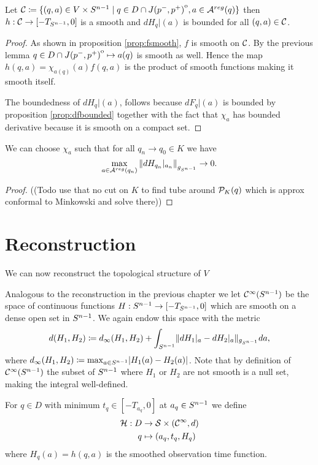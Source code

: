 \begin{corollary}\label{cor:hsmooth}
    Let ${\mathcal{C}}\coloneqq \{(q,a)\in V\times {S^{n-1}} \mid q \in D\cap {\kern0ptJ(p^-,p^+)}^{\mathrm{o}}, a\in {{\mathcal{A}}^{reg}}(q)\}$ then $h:{\mathcal{C}}\to [-T_{S^{n-1}},0]$ is a smooth and $dH_q\rvert(a)$ is bounded for all $(q,a)\in {\mathcal{C}}$.
\end{corollary}
\begin{proof}
    As shown in proposition \ref{prop:fsmooth}, $f$ is smooth on ${\mathcal{C}}$. By the previous lemma $q\in D\cap {\kern0ptJ(p^-,p^+)}^{\mathrm{o}}\mapsto a(q)$ is smooth as well.
    Hence the map $h(q,a) = \chi_{a(q)}(a)f(q,a)$ is the product of smooth functions making it smooth itself.

    The boundedness of $dH_q\rvert(a)$, follows because $dF_q\rvert(a)$ is bounded by proposition \ref{prop:dfbounded} together with the fact that $\chi_{a}$ has bounded derivative because it is smooth on a compact set.
\end{proof}

\begin{lemma}\label{lem:dhconvonboundary}
    We can choose $\chi_a$ such that for all $q_n \to q_0\in K$ we have
    \[
        \max_{a\in {{\mathcal{A}}^{reg}}(q_n)} \left\lVert dH_{q_n}\rvert_{a_n}\right\rVert_{g_{S^{n-1}}}\to 0.
    \]
\end{lemma}
\begin{proof}
    ((Todo use that no cut on $K$ to find tube around ${{\mathcal{P}}_K(q)}$ which is approx conformal to Minkowski and solve there))
\end{proof}

\section{Reconstruction}
We can now reconstruct the topological structure of $V$

Analogous to the reconstruction in the previous chapter we let ${\mathcal{C}}^{\infty}({S^{n-1}})$ be the space of continuous functions $H:{S^{n-1}} \to [-T_{S^{n-1}},0]$ which are smooth on a dense open set in ${S^{n-1}}$. We again endow this space with the metric 
\[
    d(H_1,H_2)\coloneqq  d_\infty(H_1,H_2) + \int_{{S^{n-1}}} \lVert dH_1\rvert_a - dH_2\rvert_a \rVert_{g_{S^{n-1}}}da,
\] where $d_\infty(H_1,H_2)\coloneqq \max_{a\in {S^{n-1}}}\lvert H_1(a)-H_2(a)\rvert$.
Note that by definition of ${\mathcal{C}}^\infty({S^{n-1}})$ the subset of ${S^{n-1}}$ where $H_1$ or $H_2$ are not smooth is a null set, making the integral well-defined.

For $q\in D$ with minimum $t_q\in [-T_{a_q},0]$ at $a_q\in {S^{n-1}}$ we define
\begin{align*}
    \mathcal{H}:D &\to {\mathcal{S}}\times({\mathcal{C}}^\infty, d)\\
    q&\mapsto (a_q,t_q, H_q)
\end{align*} where $H_q(a)=h(q,a)$ is the smoothed observation time function.

